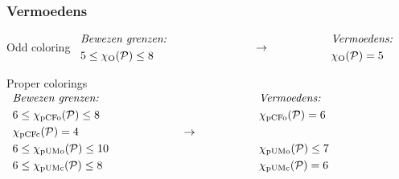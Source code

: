 \documentclass
[kulak] %
{kulakbeamer}
\begin{document}
	\begin{frame}
		\frametitle{Vermoedens}
		\vspace{0.5em}
		\begin{block}{Odd coloring}
			$
			\begin{array}{c@{\hspace{2.8cm}}c@{\hspace{2cm}}c}
				\begin{aligned}
					& \textit{Bewezen grenzen:} \\
					& 5 \leq \chi_{\mathrm{O}}(\mathcal{P}) \leq 8 \\
				\end{aligned}
				&
				\Large \rightarrow
				&
				\begin{aligned}
					& \textit{Vermoedens:} \\
					& \chi_{\mathrm{O}}(\mathcal{P}) = 5 \\
				\end{aligned}
			\end{array}
			$
		\end{block}
		\begin{block}{Proper colorings}
			$
			\begin{array}{c@{\hspace{2.35cm}}c@{\hspace{2cm}}c}
				\begin{aligned}
					 & \textit{Bewezen grenzen:}                        \\
					 & 6 \leq \chi_{\mathrm{pCFo}}(\mathcal{P}) \leq 8  \\
					 & \chi_{\mathrm{pCFc}}(\mathcal{P}) = 4            \\
					 & 6 \leq \chi_{\mathrm{pUMo}}(\mathcal{P}) \leq 10 \\
					 & 6 \leq \chi_{\mathrm{pUMc}}(\mathcal{P}) \leq 8
				\end{aligned}
				&
				\Large \rightarrow
				&
				\begin{aligned}
					& \textit{Vermoedens:} \\
					&\chi_{\mathrm{pCFo}}(\mathcal{P}) = 6 \\
					& \\
					&\chi_{\mathrm{pUMo}}(\mathcal{P}) \leq 7 \\
					&\chi_{\mathrm{pUMc}}(\mathcal{P}) = 6
				\end{aligned}
			\end{array}
			$
		\end{block}
	\end{frame}
\end{document}
